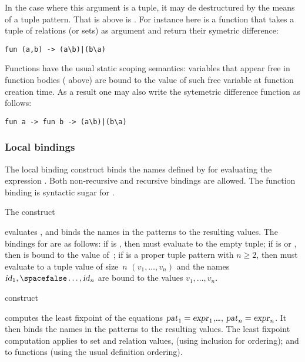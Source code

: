 In the case where this argument is a tuple, it may de destructured
by the means of a tuple pattern. That is 
above is .
For instance here is a function that takes a tuple of
relations (or sets) as argument and return their symetric difference:
\begin{verbatim}
fun (a,b) -> (a\b)|(b\a)
\end{verbatim}

Functions have the usual static scoping semantics:
variables that appear free in function bodies 
( above) are bound to
the value of such free variable at function creation time.
As a result one may also write the sytemetric difference function
as follows:
\begin{verbatim}
fun a -> fun b -> (a\b)|(b\a)
\end{verbatim}

\subsubsection*{\label{bindings}Local bindings}
The local binding construct
binds the names defined by  
for evaluating the expression .
Both non-recursive and recursive bindings are allowed.
The function binding
 is syntactic sugar
for .

The construct
\begin{center}
  
\end{center}
evaluates ,
and binds the names in the patterns
 to the resulting values.
The bindings for  are as follows:
if  is \T{(}\T{)}, then  must evaluate to the empty
tuple;
if  is  or ,
then  is bound to the value of~;
if  is a proper tuple pattern
 with $n \geq 2$,
then  must evaluate to a tuple value of size~$n$
$(v_1,\ldots,v_n)$ and the names $\nt{id}_1,\ldots,\nt{id}_n$ are
bound to the values  $v_1,\ldots,v_n$.

 construct
\begin{center}
  
\end{center}
computes the least fixpoint of the equations
$\hbox{\sl pat\/}_1 = \hbox{\sl expr\/}_1$,\ldots, $\hbox{\sl pat\/}_n = \hbox{\sl expr\/}_n$.
It then binds the names in the patterns
 to the
resulting values.
The least fixpoint computation applies to set and relation values,
(using inclusion for ordering); and to
functions (using the usual definition ordering).



